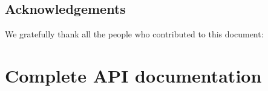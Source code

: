\documentclass[a4paper,11pt,twoside,openright]{memoir}
\begin{document}
\section*{Acknowledgements}

We gratefully thank all the people who contributed to this document:

















\chapter{Complete API documentation}
\label{chap:apidoc}





%
\end{document}
